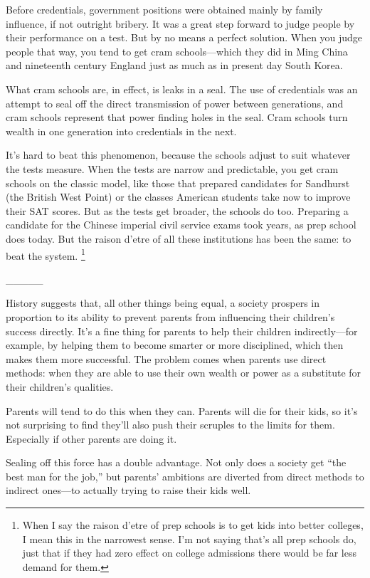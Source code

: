 \documentclass[12pt]{book}
\begin{document}
Before credentials, government positions were obtained mainly by family
influence, if not outright bribery. It was a great step forward to judge
people by their performance on a test. But by no means a perfect
solution. When you judge people that way, you tend to get cram
schools---which they did in Ming China and nineteenth century England
just as much as in present day South Korea.

What cram schools are, in effect, is leaks in a seal. The use of
credentials was an attempt to seal off the direct transmission of power
between generations, and cram schools represent that power finding holes
in the seal. Cram schools turn wealth in one generation into credentials
in the next.

It's hard to beat this phenomenon, because the schools adjust to suit
whatever the tests measure. When the tests are narrow and predictable,
you get cram schools on the classic model, like those that prepared
candidates for Sandhurst (the British West Point) or the classes
American students take now to improve their SAT scores. But as the tests
get broader, the schools do too. Preparing a candidate for the Chinese
imperial civil service exams took years, as prep school does today. But
the raison d'etre of all these institutions has been the same: to beat
the system. \footnote{When I say the raison d'etre of prep schools is to get kids into
better colleges, I mean this in the narrowest sense. I'm not saying
that's all prep schools do, just that if they had zero effect on college
admissions there would be far less demand for them.}

\_\_\_\_\_

History suggests that, all other things being equal, a society prospers
in proportion to its ability to prevent parents from influencing their
children's success directly. It's a fine thing for parents to help their
children indirectly---for example, by helping them to become smarter or
more disciplined, which then makes them more successful. The problem
comes when parents use direct methods: when they are able to use their
own wealth or power as a substitute for their children's qualities.

Parents will tend to do this when they can. Parents will die for their
kids, so it's not surprising to find they'll also push their scruples to
the limits for them. Especially if other parents are doing it.

Sealing off this force has a double advantage. Not only does a society
get ``the best man for the job,'' but parents' ambitions are diverted
from direct methods to indirect ones---to actually trying to raise their
kids well.
\end{document}
